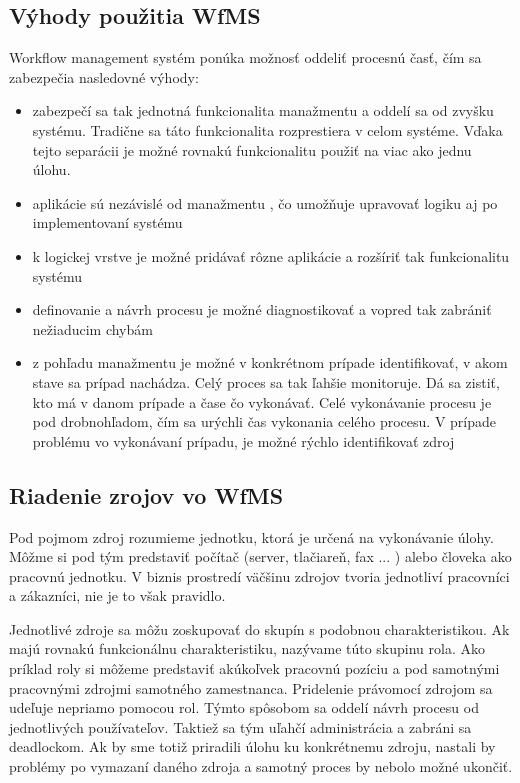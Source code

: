 %
\subsection{Výhody použitia WfMS}
Workflow management systém ponúka možnosť oddeliť procesnú časť, čím sa zabezpečia nasledovné výhody:
\begin{itemize}
	\item zabezpečí sa tak jednotná funkcionalita manažmentu a oddelí sa od zvyšku systému. Tradične sa táto funkcionalita rozprestiera v celom systéme. Vďaka tejto separácii je možné rovnakú funkcionalitu použiť na viac ako jednu úlohu.
	\item aplikácie sú nezávislé od manažmentu , čo umožňuje upravovať logiku aj po implementovaní systému
	\item k logickej vrstve je možné pridávať rôzne aplikácie a rozšíriť tak funkcionalitu systému
	\item definovanie a návrh procesu je možné diagnostikovať a vopred tak zabrániť nežiaducim chybám
	\item z pohľadu manažmentu je možné v konkrétnom prípade identifikovať, v akom stave sa prípad nachádza. Celý proces sa tak ľahšie monitoruje. Dá sa zistiť, kto má v danom prípade a čase čo vykonávať. Celé vykonávanie procesu je pod drobnohľadom, čím sa urýchli čas vykonania celého procesu. V prípade problému vo vykonávaní prípadu, je možné rýchlo identifikovať zdroj
	
\end{itemize}

\subsection{Riadenie zrojov vo WfMS}
Pod pojmom zdroj rozumieme jednotku, ktorá je určená na vykonávanie úlohy. Môžme si pod tým predstaviť počítač (server, tlačiareň, fax ... ) alebo človeka ako pracovnú jednotku. V biznis prostredí väčšinu zdrojov tvoria jednotliví pracovníci a zákazníci, nie je to však pravidlo.

Jednotlivé zdroje sa môžu zoskupovať do skupín s podobnou charakteristikou. Ak majú rovnakú funkcionálnu charakteristiku, nazývame túto skupinu rola.
Ako príklad roly si môžeme predstaviť akúkoľvek pracovnú pozíciu a pod samotnými pracovnými zdrojmi samotného zamestnanca. Pridelenie právomocí zdrojom sa udeľuje nepriamo pomocou rol. Týmto spôsobom sa oddelí návrh procesu od jednotlivých používateľov. Taktiež sa tým uľahčí administrácia a zabráni sa deadlockom. Ak by sme totiž priradili úlohu ku konkrétnemu zdroju, nastali by problémy po vymazaní daného zdroja a samotný proces by nebolo možné ukončiť.


